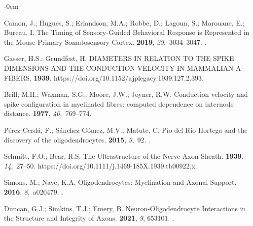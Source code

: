 \documentclass[brainsci, %
               review,accept,pdftex,moreauthors
               ]{Definitions/mdpi}
\begin{document}
\begin{adjustwidth}{-\extralength}{0cm}
\begin{thebibliography}{999}
Camon, J.; Hugues, S.; Erlandson, M.A.; Robbe, D.; Lagoun, S.; Marouane, E.;
  Bureau, I.
\newblock The {Timing} of {Sensory}-{Guided} {Behavioral} {Response} is
  {Represented} in the {Mouse} {Primary} {Somatosensory} {Cortex}.
 {\bf 2019}, {\em 29},~3034--3047.
.

Gasser, H.S.; Grundfest, H.
 {DIAMETERS} {IN} {RELATION} {TO} {THE} {SPIKE} {DIMENSIONS}
  {AND} {THE} {CONDUCTION} {VELOCITY} {IN} {MAMMALIAN} {A} {FIBERS}.
 {\bf 1939}. %
  {{https://doi.org/10.1152/ajplegacy.1939.127.2.393}}.

Brill, M.H.; Waxman, S.G.; Moore, J.W.; Joyner, R.W.
\newblock Conduction velocity and spike configuration in myelinated fibres:
  computed dependence on internode distance.
 {\bf 1977},
  {\em 40},~769--774.

Pérez-Cerdá, F.; Sánchez-Gómez, M.V.; Matute, C.
\newblock Pío del {Río} {Hortega} and the discovery of the oligodendrocytes.
 {\bf 2015}, {\em 9},~92.
.

Schmitt, F.O.; Bear, R.S.
\newblock The {Ultrastructure} of the {Nerve} {Axon} {Sheath}.
 {\bf 1939}, {\em 14},~27--50.
  {{https://doi.org/10.1111/j.1469-185X.1939.tb00922.x}}.

Simons, M.; Nave, K.A.
\newblock Oligodendrocytes: {Myelination} and {Axonal} {Support}.
 {\bf 2016}, {\em
  8},~a020479.
.

Duncan, G.J.; Simkins, T.J.; Emery, B.
\newblock Neuron-{Oligodendrocyte} {Interactions} in the {Structure} and
  {Integrity} of {Axons}.
 {\bf 2021}, {\em
  9}, 653101.
.


\end{thebibliography}
\end{adjustwidth}
\end{document}

